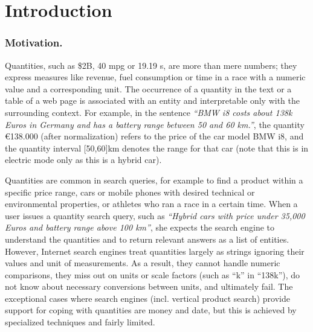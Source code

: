 
\section{Introduction}\label{sec:intro}

\subsubsection{Motivation.}


Quantities, such as \$2B, 40 mpg or 19.19 s,
are more than mere numbers; they express measures 
like revenue, fuel consumption or time in a race
with a numeric value and a corresponding unit. 
The occurrence of a quantity in the text or a table of a web page is associated 
with an entity and interpretable only with the surrounding context. 
For example, in the sentence \textit{``BMW i8 costs about 138k Euros
in Germany and has a battery range between 50 and 60 km.''},
the quantity \euro 138.000 (after normalization) refers to the price
of the car model BMW i8, and the quantity interval [50,60]km
denotes the range for that car (note that this is in electric mode only as this is a hybrid car).

Quantities are common in search queries, for example to find a product within a specific price range,  cars or mobile phones with
desired technical or environmental properties,
or athletes who ran a race in a certain time. 
 When a user issues a quantity search query, such as \textit{``Hybrid cars with price under 35,000 Euros and battery range above 100 km''}, 
 she expects the search engine to understand the quantities and to return relevant answers as a list of entities.
However, Internet search engines treat quantities largely as strings ignoring their values and unit of measurements. As a result, they
cannot handle numeric comparisons, they miss out on units
or scale factors (such as ``k'' in ``138k''), do not know about
necessary conversions between units,  and ultimately
fail. The exceptional cases where search engines 
(incl. vertical product search) provide 
support for coping with quantities are money and date,
but this is achieved by specialized techniques and 
fairly limited. 



